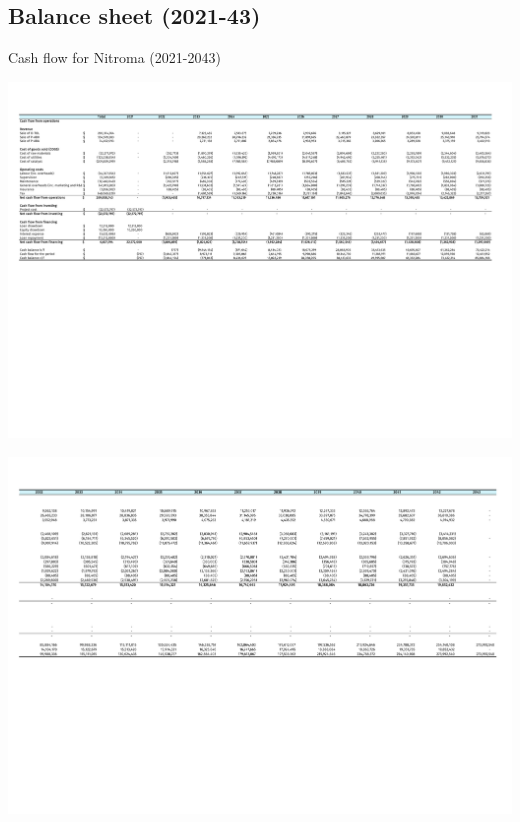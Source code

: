  \begin{landscape}
 \subsection{Balance sheet (2021-43)}
 \label{sec:balance-sheet}
\begin{table}[H]
\label{tab:CashFlow}
  \caption{Cash flow for Nitroma (2021-2043)}
\includegraphics[clip, trim=0cm 8cm 0cm 1.5cm, width=\linewidth]{chapters/Z-support/attachments/Cash1.pdf}
\end{table} 
\begin{table}[H]
\includegraphics[clip, trim=0cm 8cm 0cm 1.5cm, width=\linewidth]{chapters/Z-support/attachments/Cash2.pdf}
\end{table}
 \end{landscape}
 
